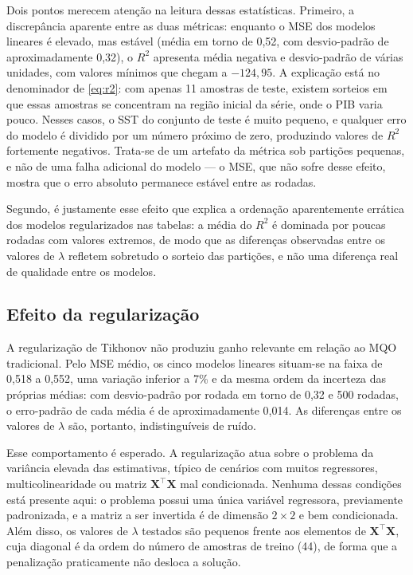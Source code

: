 \documentclass[conference]{IEEEtran}
\begin{document}
Dois pontos merecem atenção na leitura dessas estatísticas. Primeiro, a
discrepância aparente entre as duas métricas: enquanto o MSE dos modelos
lineares é elevado, mas estável (média em torno de 0,52, com desvio-padrão de
aproximadamente 0,32), o $R^2$ apresenta média negativa e desvio-padrão de
várias unidades, com valores mínimos que chegam a $-124{,}95$. A explicação está
no denominador de \eqref{eq:r2}: com apenas 11 amostras de teste, existem
sorteios em que essas amostras se concentram na região inicial da série, onde o
PIB varia pouco. Nesses casos, o SST do conjunto de teste é muito pequeno, e
qualquer erro do modelo é dividido por um número próximo de zero, produzindo
valores de $R^2$ fortemente negativos. Trata-se de um artefato da métrica sob
partições pequenas, e não de uma falha adicional do modelo --- o MSE, que não
sofre desse efeito, mostra que o erro absoluto permanece estável entre as
rodadas.

Segundo, é justamente esse efeito que explica a ordenação aparentemente errática
dos modelos regularizados nas tabelas: a média do $R^2$ é dominada por poucas
rodadas com valores extremos, de modo que as diferenças observadas entre os
valores de $\lambda$ refletem sobretudo o sorteio das partições, e não uma
diferença real de qualidade entre os modelos.

\subsection{Efeito da regularização}

A regularização de Tikhonov não produziu ganho relevante em relação ao MQO
tradicional. Pelo MSE médio, os cinco modelos lineares situam-se na faixa de
0,518 a 0,552, uma variação inferior a 7\% e da mesma ordem da incerteza das
próprias médias: com desvio-padrão por rodada em torno de 0,32 e 500 rodadas, o
erro-padrão de cada média é de aproximadamente 0,014. As diferenças entre os
valores de $\lambda$ são, portanto, indistinguíveis de ruído.

Esse comportamento é esperado. A regularização atua sobre o problema da variância
elevada das estimativas, típico de cenários com muitos regressores,
multicolinearidade ou matriz $\mathbf{X}^{\top}\mathbf{X}$ mal condicionada.
Nenhuma dessas condições está presente aqui: o problema possui uma única
variável regressora, previamente padronizada, e a matriz a ser invertida é de
dimensão $2 \times 2$ e bem condicionada. Além disso, os valores de $\lambda$
testados são pequenos frente aos elementos de $\mathbf{X}^{\top}\mathbf{X}$, cuja
diagonal é da ordem do número de amostras de treino (44), de forma que a
penalização praticamente não desloca a solução.
\end{document}
